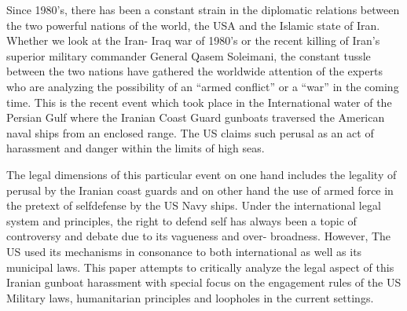 \setcounter{figure}{0}
\setcounter{table}{0}
\setcounter{footnote}{0}



\begin{multicols}{2}


\noi
Since 1980’s, there has been a constant strain in the diplomatic relations between the two
powerful nations of the world, the USA and the Islamic state of Iran. Whether we look at
the Iran- Iraq war of 1980’s or the recent killing of Iran’s superior military commander
General Qasem Soleimani, the constant tussle between the two nations have gathered the
worldwide attention of the experts who are analyzing the possibility of an “armed conflict”
or a “war” in the coming time. This is the recent event which took place in the International
water of the Persian Gulf where the Iranian Coast Guard gunboats traversed the American
naval ships from an enclosed range. The US claims such perusal as an act of harassment and
danger within the limits of high seas.

\noi
The legal dimensions of this particular event on one hand includes the legality of perusal by
the Iranian coast guards and on other hand the use of armed force in the pretext of selfdefense by the US Navy ships. Under the international legal system and principles, the right
to defend self has always been a topic of controversy and debate due to its vagueness and
over- broadness. However, The US used its mechanisms in consonance to both international
as well as its municipal laws. This paper attempts to critically analyze the legal aspect of
this Iranian gunboat harassment with special focus on the engagement rules of the US
Military laws, humanitarian principles and loopholes in the current settings.


\end{multicols}
